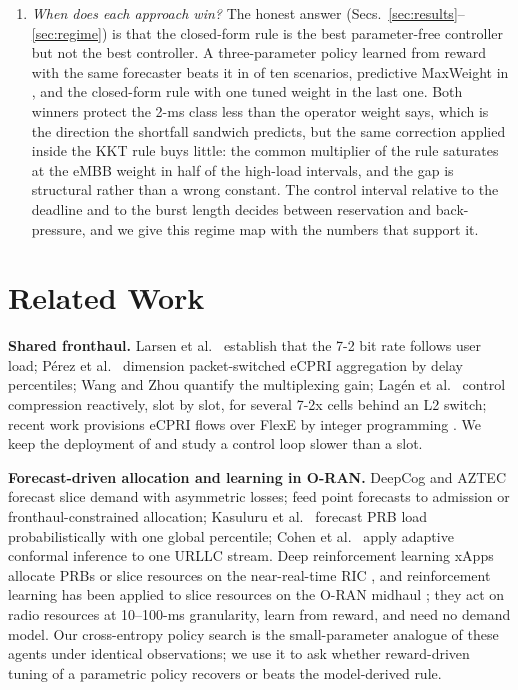 \documentclass[journal]{IEEEtran}
\begin{document}
\begin{enumerate}
\item \emph{When does each approach win?} The honest answer (Secs.~\ref{sec:results}--\ref{sec:regime}) is that the closed-form rule is the best parameter-free controller but not the best controller. A three-parameter policy learned from reward with the same forecaster beats it in \xwinscempolicy{} of ten scenarios, predictive MaxWeight in \xwinspredmaxweight{}, and the closed-form rule with one tuned weight in the last one. Both winners protect the 2-ms class less than the operator weight says, which is the direction the shortfall sandwich predicts, but the same correction applied inside the KKT rule buys little: the common multiplier of the rule saturates at the eMBB weight in half of the high-load intervals, and the gap is structural rather than a wrong constant. The control interval relative to the deadline and to the burst length decides between reservation and back-pressure, and we give this regime map with the numbers that support it.
\end{enumerate}

\section{Related Work}
\label{sec:related}
\textbf{Shared fronthaul.} Larsen et al.\ \cite{larsen2019} establish that the 7-2 bit rate follows user load; P\'erez et al.\ \cite{perez2018} dimension packet-switched eCPRI aggregation by delay percentiles; Wang and Zhou \cite{wang2017} quantify the multiplexing gain; Lag\'en et al.\ \cite{lagen2022} control compression reactively, slot by slot, for several 7-2x cells behind an L2 switch; recent work provisions eCPRI flows over FlexE by integer programming \cite{flexe2023}. We keep the deployment of \cite{lagen2022} and study a control loop slower than a slot.

\textbf{Forecast-driven allocation and learning in O-RAN.} DeepCog and AZTEC \cite{bega2019,bega2020} forecast slice demand with asymmetric losses; \cite{sciancalepore2017,kavehmadavani2023} feed point forecasts to admission or fronthaul-constrained allocation; Kasuluru et al.\ \cite{kasuluru2024} forecast PRB load probabilistically with one global percentile; Cohen et al.\ \cite{cohen2023} apply adaptive conformal inference \cite{gibbs2021} to one URLLC stream. Deep reinforcement learning xApps allocate PRBs or slice resources on the near-real-time RIC \cite{dai2025,sever2025,dora2025}, and reinforcement learning has been applied to slice resources on the O-RAN midhaul \cite{cheng2023}; they act on radio resources at 10--100-ms granularity, learn from reward, and need no demand model. Our cross-entropy policy search is the small-parameter analogue of these agents under identical observations; we use it to ask whether reward-driven tuning of a parametric policy recovers or beats the model-derived rule.
\end{document}
